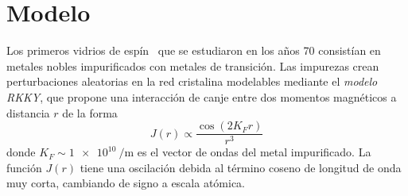 \documentclass[11pt]{report}
\newcommand{\sub}[1]{ _{{\scriptscriptstyle \mathit{#1}}}  }
\begin{document}
\section{Modelo}
Los primeros vidrios de espín~\cite{canella} que se estudiaron en los
años 70 consistían en metales nobles impurificados con metales de
transición. Las impurezas crean perturbaciones aleatorias en la
red cristalina modelables mediante el \emph{modelo RKKY}, que propone
una interacción de canje entre dos momentos magnéticos a distancia $r$ de la forma
\begin{equation}
  J(r) ∝ \frac{\cos(2K\sub{F} r)}{r^3}
\end{equation}
donde $K\sub{F} ∼ \SI{1e10}{\per\metre}$ es el vector de ondas del
metal impurificado. La función $J(r)$ tiene una oscilación debida al
término coseno de longitud de onda muy corta, cambiando de signo a
escala atómica.
\end{document}
